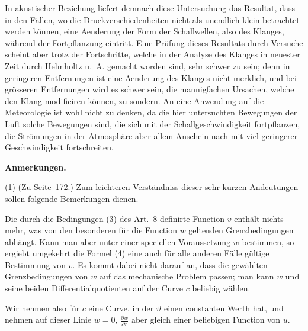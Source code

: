 \documentclass[12pt,a4paper]{book}
\theoremstyle{definition}
\theoremstyle{remark}
\begin{document}
In akustischer Beziehung liefert demnach diese Untersuchung das Resultat, dass in den F\"allen, wo die Druckverschiedenheiten nicht als unendlich klein betrachtet werden k\"onnen, eine Aenderung der Form der Schallwellen, also des Klanges, w\"ahrend der Fortpflanzung eintritt. Eine Pr\"ufung dieses Resultats durch Versuche scheint aber trotz der Fortschritte, welche in der Analyse des Klanges in neuester Zeit durch Helmholtz u.~A. gemacht worden sind, sehr schwer zu sein; denn in geringeren Entfernungen ist eine Aenderung des Klanges nicht merklich, und bei gr\"osseren Entfernungen wird es schwer sein, die mannigfachen Ursachen, welche den Klang modificiren k\"onnen, zu sondern. An eine Anwendung auf die Meteorologie ist wohl nicht zu denken, da die hier untersuchten Bewegungen der Luft solche Bewegungen sind, die sich mit der Schallgeschwindigkeit fortpflanzen, die Str\"omungen in der Atmosph\"are aber allem Anschein nach mit viel geringerer Geschwindigkeit fortschreiten.

\newpage
\begin{center}
\Large\textbf{Anmerkungen.}
\end{center}

\smallskip
\noindent (1) (Zu Seite~172.) Zum leichteren Verst\"andniss dieser sehr kurzen Andeutungen sollen folgende Bemerkungen dienen.

Die durch die Bedingungen (3) des Art.~8 definirte Function $v$ enth\"alt nichts mehr, was von den besonderen f\"ur die Function $w$ geltenden Grenzbedingungen abh\"angt. Kann man aber unter einer speciellen Voraussetzung $w$ bestimmen, so ergiebt umgekehrt die Formel (4) eine auch f\"ur alle anderen F\"alle g\"ultige Bestimmung von $v$. Es kommt dabei nicht darauf an, dass die gew\"ahlten Grenzbedingungen von $w$ auf das mechanische Problem passen; man kann $w$ und seine beiden Differentialquotienten auf der Curve $c$ beliebig w\"ahlen.

Wir nehmen also f\"ur $c$ eine Curve, in der $\vartheta$ einen constanten Werth hat, und nehmen auf dieser Linie $w = 0$, $\frac{\partial w}{\partial r}$ aber gleich einer beliebigen Function von $u$.
\end{document}
